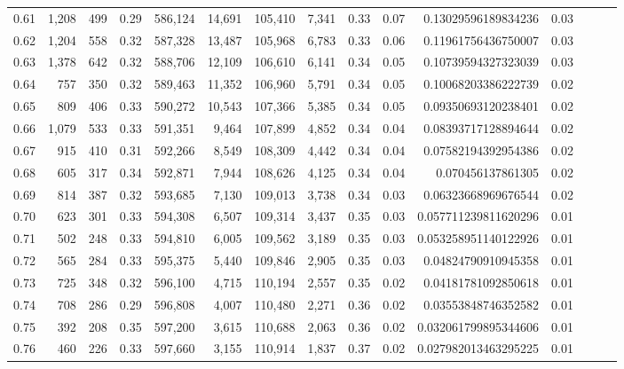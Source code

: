 \begin{tabular}{rrrrrrrrrrrrrrr}
0.61 &   1,208 &    499 &  0.29 &  586,124 &   14,691 &  105,410 &    7,341 &  0.33 &  0.07 &     0.13029596189834236 &      0.03 \\
0.62 &   1,204 &    558 &  0.32 &  587,328 &   13,487 &  105,968 &    6,783 &  0.33 &  0.06 &     0.11961756436750007 &      0.03 \\
0.63 &   1,378 &    642 &  0.32 &  588,706 &   12,109 &  106,610 &    6,141 &  0.34 &  0.05 &     0.10739594327323039 &      0.03 \\
0.64 &     757 &    350 &  0.32 &  589,463 &   11,352 &  106,960 &    5,791 &  0.34 &  0.05 &     0.10068203386222739 &      0.02 \\
0.65 &     809 &    406 &  0.33 &  590,272 &   10,543 &  107,366 &    5,385 &  0.34 &  0.05 &     0.09350693120238401 &      0.02 \\
0.66 &   1,079 &    533 &  0.33 &  591,351 &    9,464 &  107,899 &    4,852 &  0.34 &  0.04 &     0.08393717128894644 &      0.02 \\
0.67 &     915 &    410 &  0.31 &  592,266 &    8,549 &  108,309 &    4,442 &  0.34 &  0.04 &     0.07582194392954386 &      0.02 \\
0.68 &     605 &    317 &  0.34 &  592,871 &    7,944 &  108,626 &    4,125 &  0.34 &  0.04 &       0.070456137861305 &      0.02 \\
0.69 &     814 &    387 &  0.32 &  593,685 &    7,130 &  109,013 &    3,738 &  0.34 &  0.03 &     0.06323668969676544 &      0.02 \\
0.70 &     623 &    301 &  0.33 &  594,308 &    6,507 &  109,314 &    3,437 &  0.35 &  0.03 &    0.057711239811620296 &      0.01 \\
0.71 &     502 &    248 &  0.33 &  594,810 &    6,005 &  109,562 &    3,189 &  0.35 &  0.03 &    0.053258951140122926 &      0.01 \\
0.72 &     565 &    284 &  0.33 &  595,375 &    5,440 &  109,846 &    2,905 &  0.35 &  0.03 &     0.04824790910945358 &      0.01 \\
0.73 &     725 &    348 &  0.32 &  596,100 &    4,715 &  110,194 &    2,557 &  0.35 &  0.02 &     0.04181781092850618 &      0.01 \\
0.74 &     708 &    286 &  0.29 &  596,808 &    4,007 &  110,480 &    2,271 &  0.36 &  0.02 &     0.03553848746352582 &      0.01 \\
0.75 &     392 &    208 &  0.35 &  597,200 &    3,615 &  110,688 &    2,063 &  0.36 &  0.02 &    0.032061799895344606 &      0.01 \\
0.76 &     460 &    226 &  0.33 &  597,660 &    3,155 &  110,914 &    1,837 &  0.37 &  0.02 &    0.027982013463295225 &      0.01 \\

\end{tabular}
